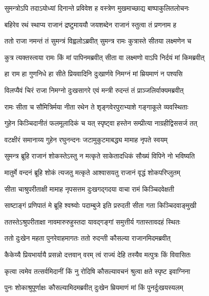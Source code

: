 
\twolineshloka
{सुमन्त्रोऽपि तदाऽयोध्यां दिनान्ते प्रविवेश ह}
{वस्त्रेण मुखमाच्छाद्य बाष्पाकुलितलोचनः} %

\twolineshloka
{बहिरेव रथं स्थाप्य राजानं द्रष्टुमाययौ}
{जयशब्देन राजानं स्तुत्वा तं प्रणनाम ह} %

\twolineshloka
{ततो राजा नमन्तं तं सुमन्त्रं विह्वलोऽब्रवीत्}
{सुमन्त्र रामः कुत्रास्ते सीतया लक्ष्मणेन च} %

\twolineshloka
{कुत्र त्यक्तस्त्वया रामः किं मां पापिनमब्रवीत्}
{सीता वा लक्ष्मणो वाऽपि निर्दयं मां किमब्रवीत्} %

\twolineshloka
{हा राम हा गुणनिधे हा सीते प्रियवादिनि}
{दुःखार्णवे निमग्नं मां म्रियमाणं न पश्यसि} %

\twolineshloka
{विलप्यैवं चिरं राजा निमग्नो दुःखसागरे}
{एवं मन्त्री रुदन्तं तं प्राञ्जलिर्वाक्यमब्रवीत्} %

\twolineshloka
{रामः सीता च सौमित्रिर्मया नीता रथेन ते}
{शृङ्गवेरपुराभ्याशे गङ्गाकूले व्यवस्थिताः} %

\twolineshloka
{गुहेन किञ्चिदानीतं फलमूलादिकं च यत्}
{स्पृष्ट्वा हस्तेन सम्प्रीत्या नाग्रहीद्विससर्ज तत्} %

\twolineshloka
{वटक्षीरं समानाय्य गुहेन रघुनन्दनः}
{जटामुकुटमाबद्ध्य मामाह नृपते स्वयम्} %

\twolineshloka
{सुमन्त्र ब्रूहि राजानं शोकस्तेऽस्तु न मत्कृते}
{साकेतादधिकं सौख्यं विपिने नो भविष्यति} %

\twolineshloka
{मातुर्मे वन्दनं ब्रूहि शोकं त्यजतु मत्कृते}
{आश्वासयतु राजानं वृद्धं शोकपरिप्लुतम्} %

\twolineshloka
{सीता चाश्रुपरीताक्षी मामाह नृपसत्तम}
{दुःखगद्गदया वाचा रामं किञ्चिदवेक्षती} %

\twolineshloka
{साष्टाङ्गं प्रणिपातं मे ब्रूहि श्वश्र्वोः पदाम्बुजे}
{इति प्ररुदती सीता गता किञ्चिदवाङ्मुखी} %

\twolineshloka
{ततस्तेऽश्रुपरीताक्षा नावमारुरुहुस्तदा}
{यावद्गङ्गां समुत्तीर्य गतास्तावदहं स्थितः} %

\twolineshloka
{ततो दुःखेन महता पुनरेवाहमागतः}
{ततो रुदन्ती कौसल्या राजानमिदमब्रवीत्} %

\twolineshloka
{कैकेय्यै प्रियभार्यायै प्रसन्नो दत्तवान् वरम्}
{त्वं राज्यं देहि तस्यैव मत्पुत्रः किं विवासितः} %

\twolineshloka
{कृत्वा त्वमेव तत्सर्वमिदानीं किं नु रोदिषि}
{कौसल्यावचनं श्रुत्वा क्षते स्पृष्ट इवाग्निना} %

\twolineshloka
{पुनः शोकाश्रुपूर्णाक्षः कौसल्यामिदमब्रवीत्}
{दुःखेन म्रियमाणं मां किं पुनर्दुःखयस्यलम्} %

